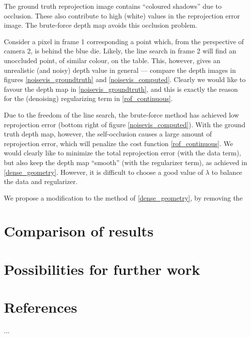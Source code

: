 \documentclass[conference]{IEEEtran}
\begin{document}
The ground truth reprojection image contains ``coloured shadows'' due to occlusion. These also contribute
to high (white) values in the reprojection error image. The brute-force depth map avoids this occlusion problem.

Consider a pixel in frame 1 corresponding a point which, from the perspective of camera 2, is behind the blue die.
Likely, the line search in frame 2 will find
an unoccluded point, of similar colour, on the table. This, however, gives an unrealistic (and noisy) depth value in general --- compare
the depth images in figures \ref{noisevis_groundtruth} and \ref{noisevis_computed}. Clearly we would like to favour the depth map in
\eqref{noisevis_groundtruth}, and this is exactly the reason for the (denoising) regularizing term in \eqref{rof_continuous}.

Due to the freedom of the line search, the brute-force method has achieved low reprojection error (bottom right of figure \ref{noisevis_computed}).
With the ground truth depth map, however, the self-occlusion causes a large amount of reprojection error, which will penalize the cost function
\eqref{rof_continuous}. We would clearly like to minimize the total reprojection error (with the data term), but also keep the depth map ``smooth'' (with the regularizer term), as achieved in \ref{dense_geometry}.
However, it is difficult to choose a good value of $\lambda$ to balance the data and regularizer.

We propose a modification to the method of \ref{dense_geometry}, by removing the 









\section{Comparison of results}
\section{Possibilities for further work}

\section*{References}
...
\end{document}
